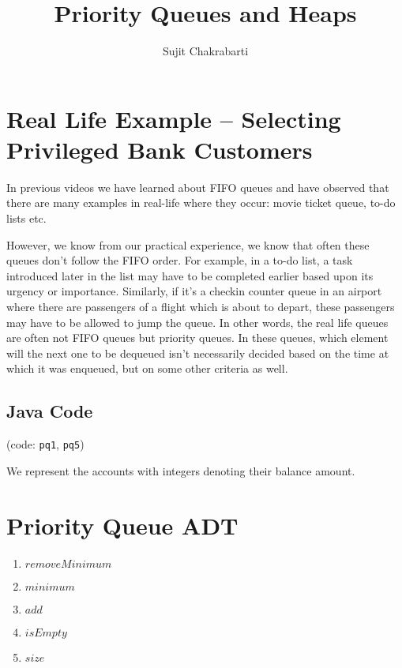 \documentclass[12pt,a4paper]{article}
\author{Sujit Chakrabarti}
\title{Priority Queues and Heaps}
\date{}
\begin{document}

\newcommand{\highlight}[1]{{\color{Red}(#1)}}
\newcommand{\comment}[1]{{\color{Blue}#1}}


\maketitle

\section{Real Life Example -- Selecting Privileged Bank Customers}

In previous videos we have learned about FIFO queues and have observed that there are many examples in real-life where they occur: movie ticket queue, to-do lists etc.

However, we know from our practical experience, we know that often these queues don't follow the FIFO order. For example, in a to-do list, a task introduced later in the list may have to be completed earlier based upon its urgency or importance. Similarly, if it's a checkin counter queue in an airport where there are passengers of a flight which is about to depart, these passengers may have to be allowed to jump the queue. In other words, the real life queues are often not FIFO queues but priority queues. In these queues, which element will the next one to be dequeued isn't necessarily decided based on the time at which it was enqueued, but on some other criteria as well.

\subsection{Java Code}
(code: \texttt{pq1}, \texttt{pq5})

We represent the accounts with integers denoting their balance amount.

\section{Priority Queue ADT}
\begin{enumerate}
	\item $removeMinimum$
    \item $minimum$
    \item $add$
    \item $isEmpty$
    \item $size$
\end{enumerate}
\end{document}
